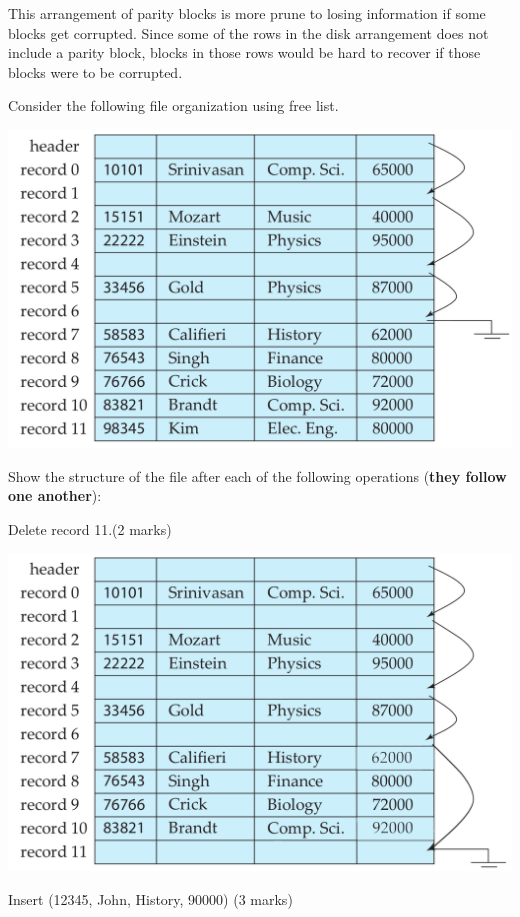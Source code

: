 \documentclass[a4 paper]{article}
\begin{document}
This arrangement of parity blocks is more prune to losing information if some blocks get corrupted.
Since some of the rows in the disk arrangement does not include a parity block, blocks in those rows 
would be hard to recover if those blocks were to be corrupted.

Consider the following file organization using free list.

{\centering \includegraphics[width=\textwidth/2]{figure2.png}}

Show the structure of the file after each of the following operations (\textbf{they follow one another}):

 Delete record 11.\indent (2 marks)

{\centering \includegraphics[width=\textwidth/2]{figure2 - copy.png}}

 Insert (12345, John, History, 90000) (3 marks)
\end{document}
